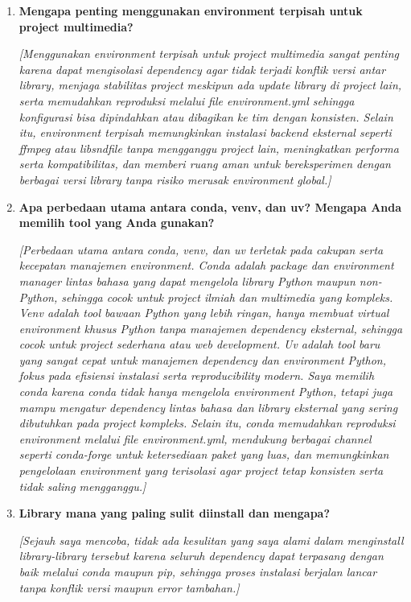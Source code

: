 \documentclass[11pt,a4paper]{article}
\begin{document}
\begin{enumerate}
    \item \textbf{Mengapa penting menggunakan environment terpisah untuk project multimedia?}
    
    \textit{[Menggunakan environment terpisah untuk project multimedia sangat penting karena dapat mengisolasi dependency agar tidak terjadi konflik versi antar library, menjaga stabilitas project meskipun ada update library di project lain, serta memudahkan reproduksi melalui file environment.yml sehingga konfigurasi bisa dipindahkan atau dibagikan ke tim dengan konsisten. Selain itu, environment terpisah memungkinkan instalasi backend eksternal seperti ffmpeg atau libsndfile tanpa mengganggu project lain, meningkatkan performa serta kompatibilitas, dan memberi ruang aman untuk bereksperimen dengan berbagai versi library tanpa risiko merusak environment global.]}
    
    \item \textbf{Apa perbedaan utama antara conda, venv, dan uv? Mengapa Anda memilih tool yang Anda gunakan?}
    
    \textit{[Perbedaan utama antara conda, venv, dan uv terletak pada cakupan serta kecepatan manajemen environment. Conda adalah package dan environment manager lintas bahasa yang dapat mengelola library Python maupun non-Python, sehingga cocok untuk project ilmiah dan multimedia yang kompleks. Venv adalah tool bawaan Python yang lebih ringan, hanya membuat virtual environment khusus Python tanpa manajemen dependency eksternal, sehingga cocok untuk project sederhana atau web development. Uv adalah tool baru yang sangat cepat untuk manajemen dependency dan environment Python, fokus pada efisiensi instalasi serta reproducibility modern.
    Saya memilih conda karena conda tidak hanya mengelola environment Python, tetapi juga mampu mengatur dependency lintas bahasa dan library eksternal yang sering dibutuhkan pada project kompleks. Selain itu, conda memudahkan reproduksi environment melalui file environment.yml, mendukung berbagai channel seperti conda-forge untuk ketersediaan paket yang luas, dan memungkinkan pengelolaan environment yang terisolasi agar project tetap konsisten serta tidak saling mengganggu.]}
    
    \item \textbf{Library mana yang paling sulit diinstall dan mengapa?}
    
    \textit{[Sejauh saya mencoba, tidak ada kesulitan yang saya alami dalam menginstall library-library tersebut karena seluruh dependency dapat terpasang dengan baik melalui conda maupun pip, sehingga proses instalasi berjalan lancar tanpa konflik versi maupun error tambahan.]}
    

\end{enumerate}
\end{document}
